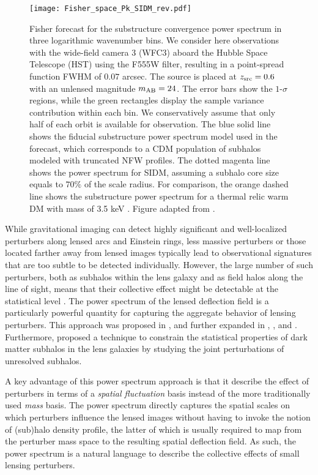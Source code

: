 \vspace{1em} 
\begin{figure}[t]
\centering
\texttt{[image: Fisher\_space\_Pk\_SIDM\_rev.pdf]}
\caption{Fisher forecast for the substructure convergence power spectrum in three logarithmic wavenumber bins. We consider here observations with the wide-field camera 3 (WFC3) aboard the Hubble Space Telescope (HST) using the F555W filter, resulting in a point-spread function FWHM of $0.07$ arcsec. The source is placed at $z_{\rm src}=0.6$ with an unlensed magnitude $m_{\rm AB}=24$. The error bars show the $1$-$\sigma$ regions, while the green rectangles display the sample variance contribution within each bin. We conservatively assume that only half of each orbit is available for observation. The blue solid line shows the fiducial substructure power spectrum model used in the forecast, which corresponds to a CDM population of subhalos modeled with truncated NFW profiles. The dotted magenta line shows the power spectrum for SIDM, assuming a subhalo core size equals to $70\%$ of the scale radius. For comparison, the orange dashed line shows the substructure power spectrum for a thermal relic warm DM with mass of 3.5 keV \citep{Viel:2013}. Figure adapted from \cite{Cyr-Racine:2018htu}. \label{fig:pksub_fisher}}
\end{figure}

While gravitational imaging can detect highly significant and well-localized perturbers along lensed arcs and Einstein rings, less massive perturbers or those located farther away from lensed images typically lead to observational signatures that are too subtle to be detected individually. However, the large number of such perturbers, both as subhalos within the lens galaxy and as field halos along the line of sight, means that their collective effect might be detectable at the statistical level \citep[\eg,][]{Birrer2017}. The power spectrum of the lensed deflection field is a particularly powerful quantity for capturing the aggregate behavior of lensing perturbers. This approach was proposed in \cite{Hezaveh_2014}, and further expanded in \cite{Rivero:2017mao}, \cite{Chatterjee_2017}, and \cite{Cyr-Racine:2018htu}. 
Furthermore, \cite{Daylan:2017kfh} proposed a technique to constrain the statistical properties of dark matter subhalos in the lens galaxies by studying the joint perturbations of unresolved subhalos.

A key advantage of this power spectrum approach is that it describe the effect of perturbers in terms of a \emph{spatial fluctuation} basis instead of the more traditionally used \emph{mass} basis. The power spectrum directly captures the spatial scales on which perturbers influence the lensed images without having to invoke the notion of (sub)halo density profile, the latter of which is usually required to map from the perturber mass space to the resulting spatial deflection field. As such, the power spectrum is a natural language to describe the collective effects of small lensing perturbers. 

